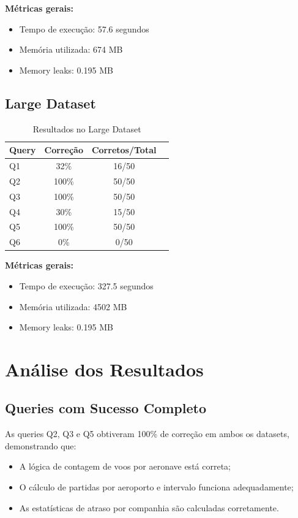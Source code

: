 \documentclass[a4paper,12pt]{scrreprt}
\begin{document}
\textbf{Métricas gerais:}
\begin{itemize}
    \item Tempo de execução: 57.6 segundos
    \item Memória utilizada: 674 MB
    \item Memory leaks: 0.195 MB
\end{itemize}

\subsection{Large Dataset}

\begin{table}[H]
\centering
\begin{tabular}{|l|c|c|c|}
\hline
\textbf{Query} & \textbf{Correção} & \textbf{Corretos/Total} \\
\hline
Q1 & 32\% & 16/50 \\
\hline
Q2 & 100\% & 50/50 \\
\hline
Q3 & 100\% & 50/50 \\
\hline
Q4 & 30\% & 15/50 \\
\hline
Q5 & 100\% & 50/50 \\
\hline
Q6 & 0\% & 0/50 \\
\hline
\end{tabular}
\caption{Resultados no Large Dataset}
\end{table}

\textbf{Métricas gerais:}
\begin{itemize}
    \item Tempo de execução: 327.5 segundos
    \item Memória utilizada: 4502 MB
    \item Memory leaks: 0.195 MB
\end{itemize}

\section{Análise dos Resultados}

\subsection{Queries com Sucesso Completo}

As queries Q2, Q3 e Q5 obtiveram 100\% de correção em ambos os datasets, demonstrando que:
\begin{itemize}
    \item A lógica de contagem de voos por aeronave está correta;
    \item O cálculo de partidas por aeroporto e intervalo funciona adequadamente;
    \item As estatísticas de atraso por companhia são calculadas corretamente.
\end{itemize}
\end{document}
